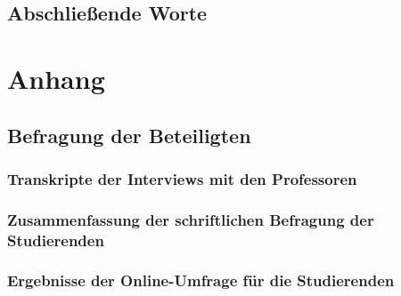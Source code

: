 \documentclass[bibliography=totoc,listof=totoc,BCOR=5mm,DIV=12,oneside]{scrbook}
\begin{document}
\section{Abschließende Worte}

\listoftables
\listoffigures
\lstlistoflistings

\newpage
\appendix


\chapter{Anhang}

\newpage
\section{Befragung der Beteiligten}

\newpage
\subsection{Transkripte der Interviews mit den Professoren}
\label{anhang:interviewProfessorenTranskripte}






\newpage
\subsection{Zusammenfassung der schriftlichen Befragung der Studierenden}
\label{anhang:schriftlicheBefragungStudierendeZusammenfassung}


\newpage
\subsection{Ergebnisse der Online-Umfrage für die Studierenden}
\label{anhang:onlineUmfrageStudierendeErgebnisse}



\nocite{*}
\printbibliography
\end{document}

